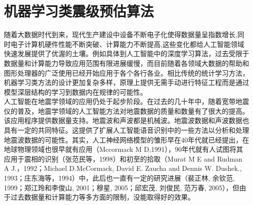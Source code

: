 
\chapter{机器学习类震级预估算法}
\indent 随着大数据时代到来，现代生产建设中设备不断电子化使得数据量呈指数增长,同时电子计算机硬件性能不断突破、计算能力不断提高,这些变化都给人工智能领域快速发展提供了优渥的土壤。例如具体到人工智能中的深度学习算法，过去受限于数据量和计算能力导致应用范围有限进展缓慢，而目前随着各领域大数据的帮助和图形处理器的广泛使用已经开始应用于各个各行各业。相比传统的统计学习方法，机器学习类方法的设计更加复杂多样，原理上提供无需手动进行特征工程而是通过模型深层结构的学习到数据内在规律的可能性。\\
\indent 人工智能在地震学领域的应用仍处于起步阶段。在过去的几十年中，随着宽带地震仪的普及，地震学领域的人工智能方法对地震数据的质量和数量有了很大的提高。该应用程序提供数据量支持。地震波和声波都是机械波。地震波数据和声波数据也具有一定的共同特征。这提供了扩展人工智能语音识别中的一些方法以分析和处理地震波数据的可能性。其实，人工神经网络模型的雏形早在40年代就已经提出，在地球物理领域也很早就有应用（Mccormack M D,1991），90年代就有人试图将其应用于震相的识别（张范民等，1998）和初至的拾取（Murat M E and Rudman A J.，1992；Michael D.McCormack, David E. Zaucha and Dennis W. Dushek., 1993；庄东海等，1994）中，此后也一直有一定的研究进展（裴正林, 余钦范, 1999；郑江玲和李俊山, 2001；穆星, 2005；邱宏茂, 刘俊民, 范万春, 2005），但由于过去数据量和计算能力等多方面的限制，没能取得好的效果。\\

